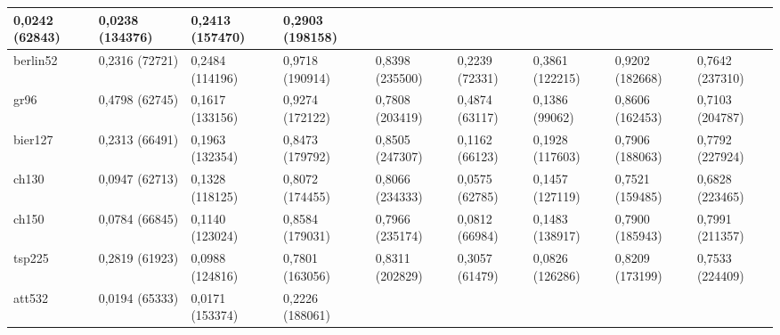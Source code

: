 \begin{longtable}[c]{|l|llll|llll|}
      \multicolumn{1}{l|}{0,0242 (62843)} &
      \multicolumn{1}{l|}{0,0238 (134376)} &
      \multicolumn{1}{l|}{0,2413 (157470)} &
      0,2903 (198158) \\ \hline
    berlin52 &
      \multicolumn{1}{l|}{0,2316 (72721)} &
      \multicolumn{1}{l|}{0,2484 (114196)} &
      \multicolumn{1}{l|}{0,9718 (190914)} &
      0,8398 (235500) &
      \multicolumn{1}{l|}{0,2239 (72331)} &
      \multicolumn{1}{l|}{0,3861 (122215)} &
      \multicolumn{1}{l|}{0,9202 (182668)} &
      0,7642 (237310) \\ \hline
    gr96 &
      \multicolumn{1}{l|}{0,4798 (62745)} &
      \multicolumn{1}{l|}{0,1617 (133156)} &
      \multicolumn{1}{l|}{0,9274 (172122)} &
      0,7808 (203419) &
      \multicolumn{1}{l|}{0,4874 (63117)} &
      \multicolumn{1}{l|}{0,1386 (99062)} &
      \multicolumn{1}{l|}{0,8606 (162453)} &
      0,7103 (204787) \\ \hline
    bier127 &
      \multicolumn{1}{l|}{0,2313 (66491)} &
      \multicolumn{1}{l|}{0,1963 (132354)} &
      \multicolumn{1}{l|}{0,8473 (179792)} &
      0,8505 (247307) &
      \multicolumn{1}{l|}{0,1162 (66123)} &
      \multicolumn{1}{l|}{0,1928 (117603)} &
      \multicolumn{1}{l|}{0,7906 (188063)} &
      0,7792 (227924) \\ \hline
    ch130 &
      \multicolumn{1}{l|}{0,0947 (62713)} &
      \multicolumn{1}{l|}{0,1328 (118125)} &
      \multicolumn{1}{l|}{0,8072 (174455)} &
      0,8066 (234333) &
      \multicolumn{1}{l|}{0,0575 (62785)} &
      \multicolumn{1}{l|}{0,1457 (127119)} &
      \multicolumn{1}{l|}{0,7521 (159485)} &
      0,6828 (223465) \\ \hline
    ch150 &
      \multicolumn{1}{l|}{0,0784 (66845)} &
      \multicolumn{1}{l|}{0,1140 (123024)} &
      \multicolumn{1}{l|}{0,8584 (179031)} &
      0,7966 (235174) &
      \multicolumn{1}{l|}{0,0812 (66984)} &
      \multicolumn{1}{l|}{0,1483 (138917)} &
      \multicolumn{1}{l|}{0,7900 (185943)} &
      0,7991 (211357) \\ \hline
    tsp225 &
      \multicolumn{1}{l|}{0,2819 (61923)} &
      \multicolumn{1}{l|}{0,0988 (124816)} &
      \multicolumn{1}{l|}{0,7801 (163056)} &
      0,8311 (202829) &
      \multicolumn{1}{l|}{0,3057 (61479)} &
      \multicolumn{1}{l|}{0,0826 (126286)} &
      \multicolumn{1}{l|}{0,8209 (173199)} &
      0,7533 (224409) \\ \hline
    att532 &
      \multicolumn{1}{l|}{0,0194 (65333)} &
      \multicolumn{1}{l|}{0,0171 (153374)} &
      \multicolumn{1}{l|}{0,2226 (188061)} &

\end{longtable}
